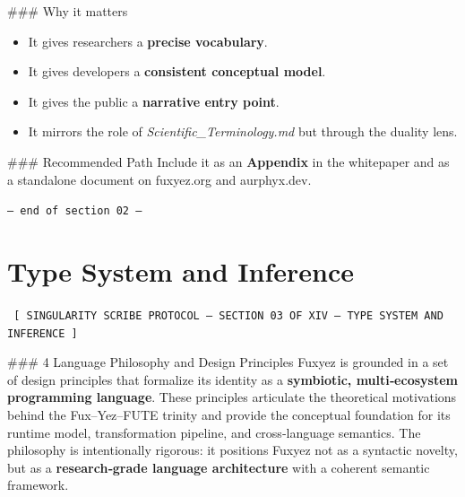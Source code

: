 \#\#\# Why it matters  
\begin{itemize}
  \item It gives researchers a \textbf{precise vocabulary}.  
  \item It gives developers a \textbf{consistent conceptual model}.  
  \item It gives the public a \textbf{narrative entry point}.  
  \item It mirrors the role of \textit{Scientific_Terminology.md} but through the duality lens.  
\end{itemize}

\#\#\# Recommended Path  
Include it as an \textbf{Appendix} in the whitepaper and as a standalone document on fuxyez.org and aurphyx.dev.
    
    \vspace{1cm}
    \begin{center}
    \color{alienPurple}\texttt{--- end of section 02 ---}
    \end{center}
    \clearpage
    

    \chapter*{Type System and Inference}
    
    
    \begin{glyphbox}
    \centering
    \color{neonCyan}\fontsize{8}{10}\selectfont\texttt{
    [ SINGULARITY SCRIBE PROTOCOL -- SECTION 03 OF XIV -- TYPE SYSTEM AND INFERENCE ]
    }
    \end{glyphbox}
    \vspace{0.3cm}
    
    
    \#\#\# 4 Language Philosophy and Design Principles  
Fuxyez is grounded in a set of design principles that formalize its identity as a \textbf{symbiotic, multi‑ecosystem programming language}. These principles articulate the theoretical motivations behind the Fux–Yez–FUTE trinity and provide the conceptual foundation for its runtime model, transformation pipeline, and cross‑language semantics. The philosophy is intentionally rigorous: it positions Fuxyez not as a syntactic novelty, but as a \textbf{research‑grade language architecture} with a coherent semantic framework.

